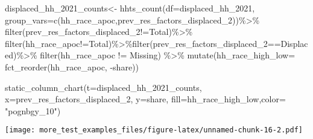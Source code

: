 \documentclass[
]{article}
\newenvironment{Shaded}{\begin{snugshade}}{\end{snugshade}}
\newcommand{\AttributeTok}[1]{\textcolor[rgb]{0.77,0.63,0.00}{#1}}
\newcommand{\FunctionTok}[1]{\textcolor[rgb]{0.00,0.00,0.00}{#1}}
\newcommand{\NormalTok}[1]{#1}
\newcommand{\OtherTok}[1]{\textcolor[rgb]{0.56,0.35,0.01}{#1}}
\newcommand{\SpecialCharTok}[1]{\textcolor[rgb]{0.00,0.00,0.00}{#1}}
\newcommand{\StringTok}[1]{\textcolor[rgb]{0.31,0.60,0.02}{#1}}
\begin{document}
\begin{Shaded}
\begin{Highlighting}[]
\NormalTok{displaced\_hh\_2021\_counts}\OtherTok{\textless{}{-}} \FunctionTok{hhts\_count}\NormalTok{(}\AttributeTok{df=}\NormalTok{displaced\_hh\_2021, }\AttributeTok{group\_vars=}\FunctionTok{c}\NormalTok{(}\StringTok{\textquotesingle{}hh\_race\_apoc\textquotesingle{}}\NormalTok{,}\StringTok{\textquotesingle{}prev\_res\_factors\_displaced\_2\textquotesingle{}}\NormalTok{))}\SpecialCharTok{\%\textgreater{}\%}
\FunctionTok{filter}\NormalTok{(prev\_res\_factors\_displaced\_2}\SpecialCharTok{!=}\StringTok{\textquotesingle{}Total\textquotesingle{}}\NormalTok{)}\SpecialCharTok{\%\textgreater{}\%}
  \FunctionTok{filter}\NormalTok{(hh\_race\_apoc}\SpecialCharTok{!=}\StringTok{\textquotesingle{}Total\textquotesingle{}}\NormalTok{)}\SpecialCharTok{\%\textgreater{}\%}\FunctionTok{filter}\NormalTok{(prev\_res\_factors\_displaced\_2}\SpecialCharTok{==}\StringTok{\textquotesingle{}Displaced\textquotesingle{}}\NormalTok{)}\SpecialCharTok{\%\textgreater{}\%}
  \FunctionTok{filter}\NormalTok{(hh\_race\_apoc }\SpecialCharTok{!=} \StringTok{\textquotesingle{}Missing\textquotesingle{}}\NormalTok{) }\SpecialCharTok{\%\textgreater{}\%}
  \FunctionTok{mutate}\NormalTok{(}\AttributeTok{hh\_race\_high\_low=} \FunctionTok{fct\_reorder}\NormalTok{(hh\_race\_apoc, }\SpecialCharTok{{-}}\NormalTok{share))}

\FunctionTok{static\_column\_chart}\NormalTok{(}\AttributeTok{t=}\NormalTok{displaced\_hh\_2021\_counts, }\AttributeTok{x=}\StringTok{\textquotesingle{}prev\_res\_factors\_displaced\_2\textquotesingle{}}\NormalTok{, }\AttributeTok{y=}\StringTok{\textquotesingle{}share\textquotesingle{}}\NormalTok{, }\AttributeTok{fill=}\StringTok{\textquotesingle{}hh\_race\_high\_low\textquotesingle{}}\NormalTok{,}\AttributeTok{color=}  \StringTok{"pognbgy\_10"}\NormalTok{)}
\end{Highlighting}
\end{Shaded}

\texttt{[image: more\_test\_examples\_files/figure-latex/unnamed-chunk-16-2.pdf]}
\end{document}
